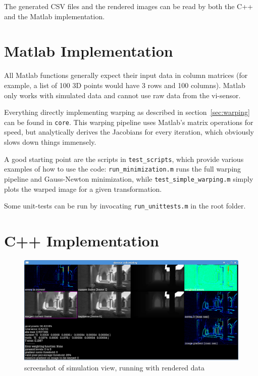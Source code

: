 The generated CSV files and the rendered images can be read by both the C++ and
the Matlab implementation.


\section{Matlab Implementation}

All Matlab functions generally expect their input data in column matrices (for
example, a list of 100 3D points would have 3 rows and 100 columns). Matlab
only works with simulated data and cannot use raw data from the vi-sensor.

Everything directly implementing warping as described in
section~\ref{sec:warping} can be found in \texttt{core}. This warping pipeline
uses Matlab's matrix operations for speed, but analytically derives the
Jacobians for every iteration, which obviously slows down things immensely.

A good starting point are the scripts in \texttt{test\_scripts}, which provide
various examples of how to use the code: \texttt{run\_minimization.m} runs the
full warping pipeline and Gauss-Newton minimization, while
\texttt{test\_simple\_warping.m} simply plots the warped image for a given
transformation.

Some unit-tests can be run by invocating \texttt{run\_unittests.m} in the root folder.


\section{C++ Implementation}

\begin{figure}[h]
    \centering
    \includegraphics[width=\textwidth]{images/pc_app_screenshot_sim.png}
    \caption{screenshot of simulation view, running with rendered data}
    \label{fig:screenshot}
\end{figure}

